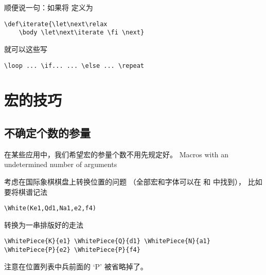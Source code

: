\documentclass{book}
\begin{document}
顺便说一句：如果将  定义为
\begin{verbatim}
\def\iterate{\let\next\relax 
    \body \let\next\iterate \fi \next}
\end{verbatim}
就可以这些写
\begin{verbatim}
\loop ... \if... ... \else ... \repeat
\end{verbatim}

\section{宏的技巧}

\subsection{不确定个数的参量}

在某些应用中，我们希望宏的参量个数不用先规定好。
\howto  Macros with an undetermined number
of arguments\par

考虑在国际象棋棋盘上转换位置的问题%
（全部宏和字体可以在 \cite{chess} 和 \cite{Tut} 中找到），
比如要将棋谱记法
\begin{verbatim}
\White(Ke1,Qd1,Na1,e2,f4)
\end{verbatim} 
转换为一串排版好的走法
\begin{verbatim}
\WhitePiece{K}{e1} \WhitePiece{Q}{d1} \WhitePiece{N}{a1} 
\WhitePiece{P}{e2} \WhitePiece{P}{f4}
\end{verbatim}
注意在位置列表中兵前面的 `P' 被省略掉了。
\end{document}
